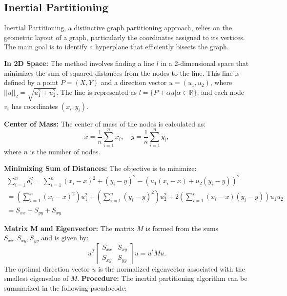 \documentclass[unicode,11pt,a4paper,oneside,numbers=endperiod,openany]{scrartcl}
\begin{document}
\subsection{Inertial Partitioning}

Inertial Partitioning, a distinctive graph partitioning approach, relies on the geometric layout of a graph, particularly the coordinates assigned to its vertices. The main goal is to identify a hyperplane that efficiently bisects the graph.

\textbf{In 2D Space:}
The method involves finding a line \( l \) in a 2-dimensional space that minimizes the sum of squared distances from the nodes to the line. This line is defined by a point \( P = (X, Y) \) and a direction vector \( u = (u_1, u_2) \), where \( ||u||_2 = \sqrt{u_1^2 + u_2^2} \). The line is represented as \( l = \{P + \alpha u | \alpha \in \mathbb{R}\} \), and each node \( v_i \) has coordinates \( (x_i, y_i) \).

\textbf{Center of Mass:}
The center of mass of the nodes is calculated as:
\begin{equation}
 x = \frac{1}{n}\sum_{i=1}^{n}x_{i}, \quad  y = \frac{1}{n}\sum_{i=1}^{n}y_{i},
\end{equation}
where \( n \) is the number of nodes.

\textbf{Minimizing Sum of Distances:}
The objective is to minimize:
\begin{equation}
\begin{aligned}
 \sum_{i=1}^n d^2_i = \sum^n_{i=1}(x_i - x)^2 +(y_i -y)^2 -(u_1(x_i-x) + u_2(y_i-y))^2\\
 =  (\sum^n_{i=1}(x_i-x)^2)u^2_1+(\sum^n_{i=1}(y_i-y)^2)u^2_2+2(\sum^n_{i=1}(x_i-x)(y_i-y))u_1u_2\\
 = S_{xx}+ S_{yy} + S_{xy}
 \end{aligned}
\end{equation}

\textbf{Matrix M and Eigenvector:}
The matrix \( M \) is formed from the sums \( S_{xx}, S_{xy}, S_{yy} \) and is given by:
\begin{equation}
 u^T \begin{bmatrix}
           S_{xx} & S_{xy} \\
           S_{xy} & S_{yy}
 \end{bmatrix} u = u^t Mu.
\end{equation}
The optimal direction vector \( u \) is the normalized eigenvector associated with the smallest eigenvalue of \( M \).
\textbf{Procedure:}
The inertial partitioning algorithm can be summarized in the following pseudocode:
\end{document}
